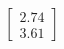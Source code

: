 \documentclass[preview]{standalone}
\begin{document}
\begin{align*}
\begin{bmatrix} 2.74 \\ 3.61 \end{bmatrix}
\end{align*}
\end{document}
